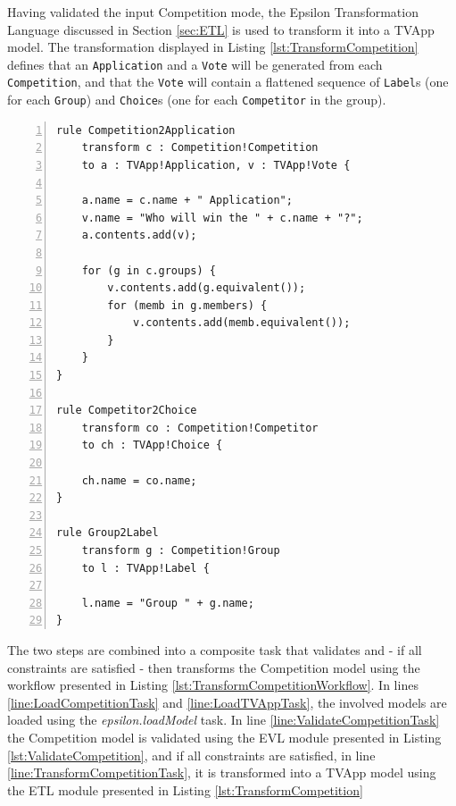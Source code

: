 Having validated the input Competition mode, the Epsilon Transformation Language discussed in Section \ref{sec:ETL} is used to transform it into a TVApp model. The transformation displayed in Listing \ref{lst:TransformCompetition} defines that an \texttt{Application} and a \texttt{Vote} will be generated from each \texttt{Competition}, and that the \texttt{Vote} will contain a flattened sequence of \texttt{Label}s (one for each \texttt{Group}) and \texttt{Choice}s (one for each \texttt{Competitor} in the group).

\begin{lstlisting}[float=tbp, basicstyle=\ttfamily\footnotesize, nolol=true, flexiblecolumns=true, numbers=left, caption=ETL transformation that transforms a Competition model into a TVApp model, tabsize=2, label=lst:TransformCompetition, language=ETL]
rule Competition2Application
	transform c : Competition!Competition
	to a : TVApp!Application, v : TVApp!Vote {

	a.name = c.name + " Application";
	v.name = "Who will win the " + c.name + "?";	
	a.contents.add(v);
	
	for (g in c.groups) {
		v.contents.add(g.equivalent());
		for (memb in g.members) {
			v.contents.add(memb.equivalent());
		}
	}
}

rule Competitor2Choice
	transform co : Competition!Competitor
	to ch : TVApp!Choice {

	ch.name = co.name;
}

rule Group2Label
	transform g : Competition!Group
	to l : TVApp!Label {
	
	l.name = "Group " + g.name;
}
\end{lstlisting}

The two steps are combined into a composite task that validates and - if all constraints are satisfied - then transforms the Competition model using the workflow presented in Listing \ref{lst:TransformCompetitionWorkflow}. In lines \ref{line:LoadCompetitionTask} and \ref{line:LoadTVAppTask}, the involved models are loaded using the \emph{epsilon.loadModel} task. In line \ref{line:ValidateCompetitionTask} the Competition model is validated using the EVL module presented in Listing \ref{lst:ValidateCompetition}, and if all constraints are satisfied, in line \ref{line:TransformCompetitionTask}, it is transformed into a TVApp model using the ETL module presented in Listing \ref{lst:TransformCompetition}

